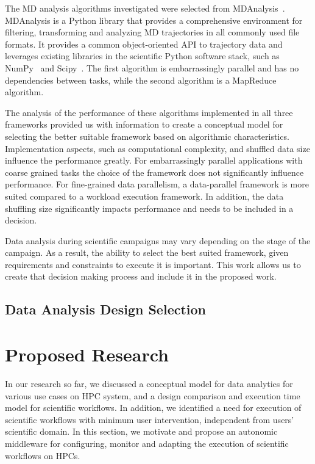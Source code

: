 The MD analysis algorithms investigated were selected from MDAnalysis~\cite{gowers2016mdanalysis,michaud2011mdanalysis}.
 MDAnalysis is a Python library that provides a comprehensive environment for 
 filtering, transforming and analyzing MD trajectories in all commonly used file 
 formats. It provides a common object-oriented API to trajectory data and leverages 
 existing libraries in the scientific Python software stack, such as NumPy~\cite{numpy} 
 and Scipy~\cite{scipy}. The first algorithm is embarrassingly parallel and has 
 no dependencies between tasks, while the second algorithm is a MapReduce 
 algorithm.

The analysis of the performance of these algorithms implemented in all three 
frameworks provided us with information to create a conceptual model for selecting 
the better suitable framework based on algorithmic characteristics. Implementation 
aspects, such as computational complexity, and shuffled data size influence the 
performance greatly. For embarrassingly parallel applications with coarse grained 
tasks the choice of the framework does not significantly influence performance. 
For fine-grained data parallelism, a data-parallel framework is more suited compared 
to a workload execution framework. In addition, the data shuffling size significantly 
impacts performance and needs to be included in a decision.

Data analysis during scientific campaigns may vary depending on the stage of the 
campaign. As a result, the ability to select the best suited framework, given 
requirements and constraints to execute it is important. This work allows us to 
create that decision making process and include it in the proposed work.

\subsection{Data Analysis Design Selection}


\section{Proposed Research}

In our research so far, we discussed a conceptual model for data analytics for 
various use cases on HPC system, and a design comparison and execution time model 
for scientific workflows. In addition, we identified a need for execution of 
scientific workflows with minimum user intervention, independent from users' 
scientific domain. In this section, we motivate and propose an autonomic middleware 
for configuring, monitor and adapting the execution of scientific workflows on 
HPCs.

